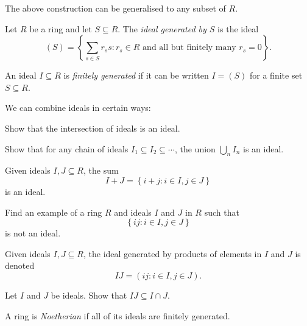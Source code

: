 \documentclass[a4paper,11pt]{article}
\begin{document}
    The above construction can be generalised to any subset of \(R\).

    \begin{example}
      Let \(R\) be a ring and let \(S \subseteq R\). The \emph{ideal generated by \(S\)} is the ideal
      \[
        (S) = \left\{ \sum_{s \in S} r_s s : r_s \in R \text{ and all but finitely many } r_s = 0 \right\}.
      \]
    \end{example}

    \begin{definition}
      An ideal \(I \subseteq R\) is \emph{finitely generated} if it can be written \(I = (S)\) for a finite set \(S \subseteq R\).
    \end{definition}

    We can combine ideals in certain ways:

    \begin{exercise}
      Show that the intersection of ideals is an ideal.
    \end{exercise}

    \begin{exercise}
      Show that for any chain of ideals \(I_1 \subseteq I_2 \subseteq \cdots\), the union \(\bigcup_n I_n\) is an ideal.
    \end{exercise}

    \begin{example}
      Given ideals \(I,J \subseteq R\), the sum
      \[
        I + J = \left\{ i + j : i \in I, j \in J \right\}
      \]
      is an ideal.
    \end{example}

    \begin{exercise}
      Find an example of a ring \(R\) and ideals \(I\) and \(J\) in \(R\) such that
      \[
        \left\{ ij : i \in I, j \in J \right\}
      \]
      is not an ideal.
    \end{exercise}

    \begin{example}
      Given ideals \(I,J \subseteq R\), the ideal generated by products of elements in \(I\) and \(J\) is denoted
      \[
        IJ = \left(ij: i \in I, j \in J\right).
      \]
    \end{example}

    \begin{exercise}
      Let \(I\) and \(J\) be ideals. Show that \(IJ \subseteq I \cap J\).
    \end{exercise}

    \begin{definition}
      A ring is \emph{Noetherian} if all of its ideals are finitely generated.
    \end{definition}
\end{document}
